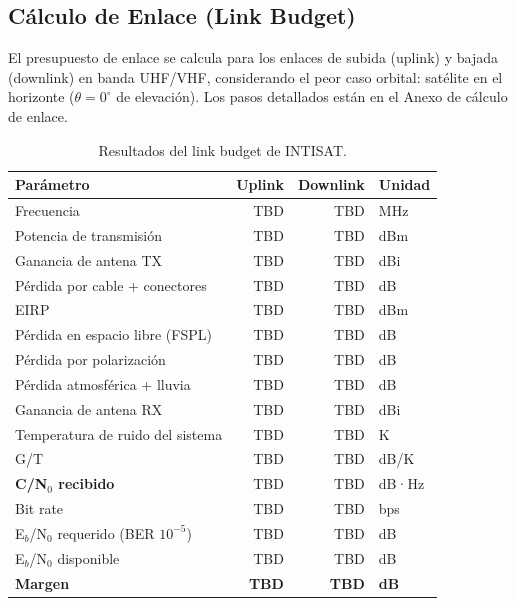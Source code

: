 
\subsection{Cálculo de Enlace (Link Budget)}

El presupuesto de enlace se calcula para los enlaces de subida (uplink) y bajada
(downlink) en banda UHF/VHF, considerando el peor caso orbital: satélite en el horizonte
($\theta = 0^\circ$ de elevación). Los pasos detallados están en el Anexo de cálculo de enlace.

\begin{table}[h]
\centering
\caption{Resultados del link budget de INTISAT.}
\label{tab:link_budget}
\renewcommand{\arraystretch}{1.15}
\begin{tabular}{lrrl}
\toprule
\textbf{Parámetro}                       & \textbf{Uplink} & \textbf{Downlink} & \textbf{Unidad} \\
\midrule
Frecuencia                                & TBD   & TBD   & MHz \\
Potencia de transmisión                   & TBD   & TBD   & dBm \\
Ganancia de antena TX                     & TBD   & TBD   & dBi \\
Pérdida por cable + conectores            & TBD   & TBD   & dB \\
EIRP                                      & TBD   & TBD   & dBm \\
Pérdida en espacio libre (FSPL)           & TBD   & TBD   & dB \\
Pérdida por polarización                  & TBD   & TBD   & dB \\
Pérdida atmosférica + lluvia              & TBD   & TBD   & dB \\
Ganancia de antena RX                     & TBD   & TBD   & dBi \\
Temperatura de ruido del sistema          & TBD   & TBD   & K \\
G/T                                       & TBD   & TBD   & dB/K \\
\textbf{C/N$_0$ recibido}                 & TBD   & TBD   & dB·Hz \\
Bit rate                                  & TBD   & TBD   & bps \\
E$_b$/N$_0$ requerido (BER $10^{-5}$)     & TBD   & TBD   & dB \\
E$_b$/N$_0$ disponible                    & TBD   & TBD   & dB \\
\textbf{Margen}                           & \textbf{TBD} & \textbf{TBD} & \textbf{dB} \\
\bottomrule
\end{tabular}
\end{table}

